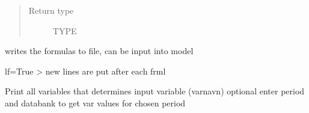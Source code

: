 \documentclass[letterpaper,10pt,english]{sphinxmanual}
\begin{document}
\begin{fulllineitems}
\begin{fulllineitems}
\begin{quote}
\begin{description}
\item[{Return type}] \leavevmode
\sphinxAtStartPar
TYPE

\end{description}\end{quote}

\end{fulllineitems}


\begin{fulllineitems}
\label{\detokenize{core/modelclass:modelclass.Display_Mixin.write_eq}}
\pysigstartsignatures
{}
\pysigstopsignatures
\sphinxAtStartPar
writes the formulas to file, can be input into model

\sphinxAtStartPar
lf=True \sphinxhyphen{}\textgreater{} new lines are put after each frml

\end{fulllineitems}


\begin{fulllineitems}
\label{\detokenize{core/modelclass:modelclass.Display_Mixin.print_eq}}
\pysigstartsignatures
{}
\pysigstopsignatures
\sphinxAtStartPar
Print all variables that determines input variable (varnavn)
optional \textendash{} enter period and databank to get var values for chosen period

\end{fulllineitems}



\end{fulllineitems}
\end{document}
